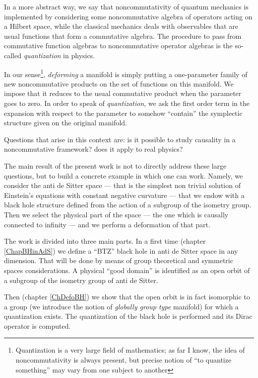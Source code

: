 In a more abstract way, we say that noncommutativity of quantum mechanics is implemented by considering some noncommutative algebra of operators acting on a Hilbert space, while the classical mechanics deals with observables that are usual functions that form a commutative algebra. The procedure to pass from commutative function algebras to noncommutative operator algebras is the so-called \emph{quantization} in physics.

In our sense\footnote{Quantization is a very large field of mathematics; as far I know, the idea of noncommutativity is always present, but precise notion of ``to quantize something'' may vary from one subject to another}, \emph{deforming} a manifold is simply putting a one-parameter family of new noncommutative products on the set of functions on this manifold. We impose that it reduces to the usual commutative product when the parameter goes to zero. In order to speak of \emph{quantization}, we ask the first order term in the expansion with respect to the parameter to somehow ``contain'' the symplectic structure given on the original manifold.

Questions that arise in this context are: is it possible to study causality in a noncommutative framework? does it apply to real physics?

The main result of the present work is not to directly address these large questions, but to build a concrete example in which one can work. Namely, we consider the anti de Sitter space --- that is the simplest non trivial solution of Einstein's equations with constant negative curvature --- that we endow with a black hole structure defined from the action of a subgroup of the isometry group. Then we select the physical part of the space --- the one which is causally connected to infinity --- and we perform a deformation of that part.

The work is divided into three main parts. In a first  time (chapter \ref{ChapBHinAdS}) we define a ``BTZ'' black hole in anti de Sitter space in any dimension. That will be done by means of group theoretical and symmetric spaces considerations. A physical ``good domain'' is identified as an open orbit of a subgroup of the isometry group of anti de Sitter. 

Then (chapter \ref{ChDefoBH}) we show that the open orbit is in fact isomorphic to a group (we introduce the notion of \emph{globally group type} manifold) for which a quantization exists. The quantization of the black hole is performed and its Dirac operator is computed.

